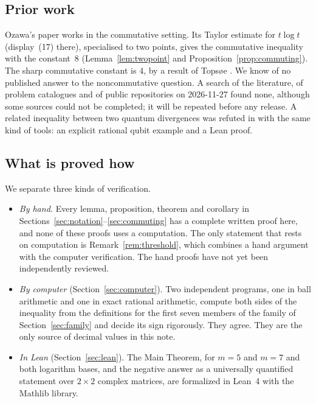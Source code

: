 \documentclass[11pt]{amsart}
\theoremstyle{definition}\newtheorem{definition}[theorem]{Definition}
\theoremstyle{remark}\newtheorem{remark}[theorem]{Remark}
\begin{document}
\subsection{Prior work}
Ozawa's paper \cite{ozawa20} works in the commutative setting. Its Taylor estimate for \(t\log t\) (display~(17) there), specialised to two points, gives the commutative inequality with the constant~\(8\) (Lemma~\ref{lem:twopoint} and Proposition~\ref{prop:commuting}). The sharp commutative constant is \(4\), by a result of Tops\o{}e \cite{topsoe00}. We know of no published answer to the noncommutative question. A search of the literature, of problem catalogues and of public repositories on 2026-11-27 found none, although some sources could not be completed; it will be repeated before any release. A related inequality between two quantum divergences was refuted in \cite{omega26} with the same kind of tools: an explicit rational qubit example and a Lean proof.

\subsection{What is proved how}
We separate three kinds of verification.
\begin{itemize}
\item \emph{By hand.} Every lemma, proposition, theorem and corollary in Sections~\ref{sec:notation}--\ref{sec:commuting} has a complete written proof here, and none of these proofs uses a computation. The only statement that rests on computation is Remark~\ref{rem:threshold}, which combines a hand argument with the computer verification. The hand proofs have not yet been independently reviewed.
\item \emph{By computer} (Section~\ref{sec:computer}). Two independent programs, one in ball arithmetic and one in exact rational arithmetic, compute both sides of the inequality from the definitions for the first seven members of the family of Section~\ref{sec:family} and decide its sign rigorously. They agree. They are the only source of decimal values in this note.
\item \emph{In Lean} (Section~\ref{sec:lean}). The Main Theorem, for \(m=5\) and \(m=7\) and both logarithm bases, and the negative answer as a universally quantified statement over \(2\times2\) complex matrices, are formalized in Lean~4 with the Mathlib library.
\end{itemize}
\end{document}
